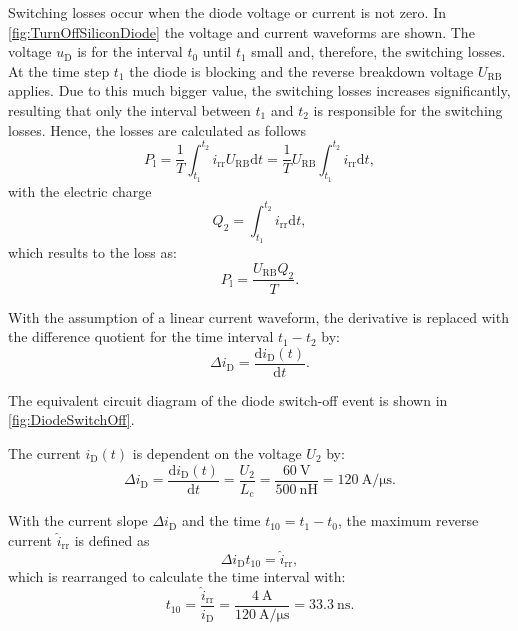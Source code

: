 \begin{solutionblock}
    Switching losses occur when the diode voltage or current is not zero. In \autoref{fig:TurnOffSiliconDiode} the voltage and current waveforms are shown. The voltage $u_{\mathrm{D}}$ is for the interval $t_0$ until $t_1$ small and, therefore, the switching losses. At the time step $t_1$ the diode is blocking and the reverse breakdown voltage $U_{\mathrm{RB}}$ applies. Due to this much bigger value, the switching losses increases significantly, resulting that only the interval between $t_1$ and $t_2$ is responsible for the switching losses. Hence, the losses are calculated as follows
    \begin{equation}
        P_{\mathrm{l}} = \frac{1}{T} \int_{t_1}^{t_2} i_{\mathrm{rr}} U_{\mathrm{RB}} \mathrm{d}t = \frac{1}{T} U_{\mathrm{RB}} \int_{t_1}^{t_2} i_{\mathrm{rr}} \mathrm{d}t,
    \end{equation}
    with the electric charge
    \begin{equation}
        Q_2 = \int_{t_1}^{t_2} i_{\mathrm{rr}} \mathrm{d}t,
        \label{eq:chargeQ2}
    \end{equation}
    which results to the loss as:
    \begin{equation}
        P_{\mathrm{l}} = \frac{U_{\mathrm{RB}}Q_2}{T}.
    \end{equation}

    With the assumption of a linear current waveform, the derivative is replaced with the difference quotient for the time interval $t_1 - t_2$ by:
    \begin{equation}
        \Delta i_{\mathrm{D}} = \frac{\mathrm{d}i_{\mathrm{D}}(t)}{\mathrm{d}t}.
    \end{equation}
    
    The equivalent circuit diagram of the diode switch-off event is shown in \autoref{fig:DiodeSwitchOff}.
    
    The current $i_{\mathrm{D}}(t)$ is dependent on the voltage $U_2$ by:
    \begin{equation}
        \Delta i_{\mathrm{D}} = \frac{\mathrm{d}i_{\mathrm{D}}(t)}{\mathrm{d}t} = \frac{U_2}{L_{\mathrm{c}}} = \frac{\SI{60}{\volt}}{\SI{500}{\nano\henry}} = \SI{120}{\ampere\per\micro\second}.
    \end{equation}
    
    With the current slope $\Delta i_{\mathrm{D}}$ and the time $t_{10} = t_1 - t_0$, the maximum reverse current $\hat{i}_{\mathrm{rr}}$ is defined as
    \begin{equation}
        \Delta i_{\mathrm{D}} t_{10} = \hat{i}_{\mathrm{rr}},
    \end{equation}
    which is rearranged to calculate the time interval with:
    \begin{equation}
        t_{10} = \frac{\hat{i}_{\mathrm{rr}}}{i_{\mathrm{D}}} = \frac{\SI{4}{\ampere}}{\SI{120}{\ampere\per\micro\second}} = \SI{33.3}{\nano\second}.
    \end{equation}


\end{solutionblock}
